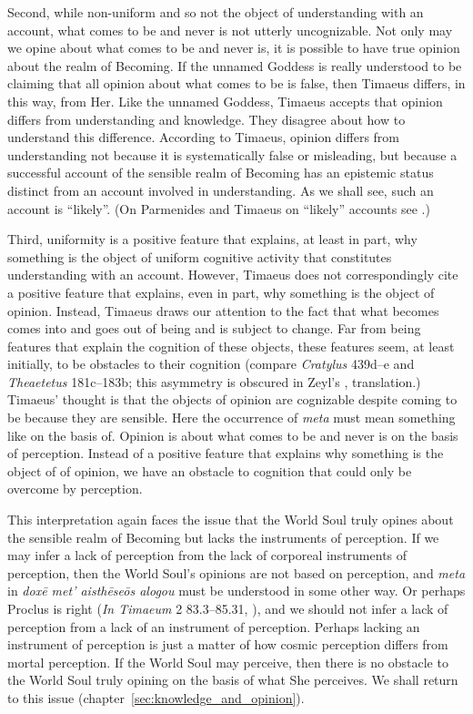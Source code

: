 Second, while non-uniform and so not the object of understanding with an account, what comes to be and never is not utterly uncognizable. Not only may we opine about what comes to be and never is, it is possible to have true opinion about the realm of Becoming. If the unnamed Goddess is really understood to be claiming that all opinion about what comes to be is false, then Timaeus differs, in this way, from Her. Like the unnamed Goddess, Timaeus accepts that opinion differs from understanding and knowledge. They disagree about how to understand this difference. According to Timaeus, opinion differs from understanding not because it is systematically false or misleading, but because a successful account of the sensible realm of Becoming has an epistemic status distinct from an account involved in understanding. As we shall see, such an account is ``likely''. (On Parmenides and Timaeus on ``likely'' accounts see \citealt{Bryan:2012bt}.)

Third, uniformity is a positive feature that explains, at least in part, why something is the object of uniform cognitive activity that constitutes understanding with an account. However, Timaeus does not correspondingly cite a positive feature that explains, even in part, why something is the object of opinion. Instead, Timaeus draws our attention to the fact that what becomes comes into and goes out of being and is subject to change. Far from being features that explain the cognition of these objects, these features seem, at least initially, to be obstacles to their cognition (compare \emph{Cratylus} 439d–e and \emph{Theaetetus} 181c–183b; this asymmetry is obscured in Zeyl's \citeyear[13]{Zeyl:2000cs}, translation.) Timaeus' thought is that the objects of opinion are cognizable despite coming to be because they are sensible. Here the occurrence of \emph{meta} must mean something like on the basis of. Opinion is about what comes to be and never is on the basis of perception. Instead of a positive feature that explains why something is the object of of opinion, we have an obstacle to cognition that could only be overcome by perception.

This interpretation again faces the issue that the World Soul truly opines about the sensible realm of Becoming but lacks the instruments of perception. If we may infer a lack of perception from the lack of corporeal instruments of perception, then the World Soul's opinions are not based on perception, and \emph{meta} in \emph{doxē met’ aisthēseōs alogou} must be understood in some other way. Or perhaps Proclus is right (\emph{In Timaeum} 2 83.3–85.31, \citealt{Diehl:1903re}), and we should not infer a lack of perception from a lack of an instrument of perception. Perhaps lacking an instrument of perception is just a matter of how cosmic perception differs from mortal perception. If the World Soul may perceive, then there is no obstacle to the World Soul truly opining on the basis of what She perceives. We shall return to this issue (chapter~\ref{sec:knowledge_and_opinion}).

